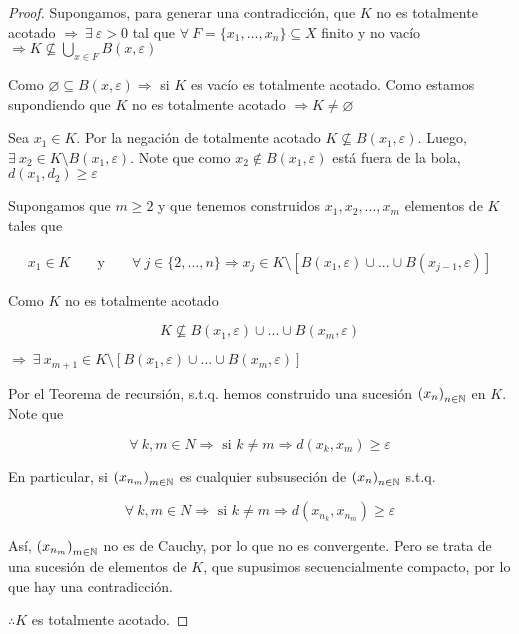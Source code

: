 \begin{proof}
    Supongamos, para generar una contradicción, que $K$ no es totalmente acotado $\Rightarrow \: \exists \: \varepsilon > 0$ tal que $\forall \: F = \{ x_1, ..., x_n \} \subseteq X$ finito y no vacío $\Rightarrow K \nsubseteq \bigcup_{x \in F} B(x, \varepsilon) $

    Como $\varnothing \subseteq B(x, \varepsilon) \Rightarrow$ si $K$ es vacío es totalmente acotado. Como estamos supondiendo que $K$ no es totalmente acotado $\Rightarrow K \neq \varnothing$

    Sea $x_1 \in K$. Por la negación de totalmente acotado $K \nsubseteq B(x_1, \varepsilon)$. Luego, $\exists \: x_2 \in K \setminus B(x_1, \varepsilon)$. Note que como $x_2 \notin B(x_1, \varepsilon)$ está fuera de la bola, $d(x_1, d_2) \geqslant \varepsilon$

    Supongamos que $m \geqslant 2$ y que tenemos construidos $x_1, x_2, ..., x_m$ elementos de $K$ tales que
    
    \begin{align*}
        x_1 \in K && \text{ y } && \forall \: j \in \{ 2, ..., n \} \Rightarrow x_j \in K \setminus \left[ B(x_1, \varepsilon) \cup ... \cup B(x_{j-1}, \varepsilon) \right]
    \end{align*}

    Como $K$ no es totalmente acotado 

    $$K \nsubseteq B(x_1, \varepsilon) \cup ... \cup B(x_m, \varepsilon)$$

    $\Rightarrow \: \exists \: x_{m+1} \in K \setminus \left[ B(x_1, \varepsilon) \cup ... \cup B(x_{m}, \varepsilon) \right]$

    Por el Teorema de recursión, s.t.q. hemos construido una sucesión ${\left(x_n\right)}_{n \in \mathbb{N}}$ en $K$. Note que

    $$\forall \: k, m \in N \Rightarrow \text{ si } k \neq m \Rightarrow d(x_k, x_m) \geqslant \varepsilon$$

    En particular, si ${\left(x_{n_m}\right)}_{m \in \mathbb{N}}$ es cualquier subsuseción de ${\left(x_n\right)}_{n \in \mathbb{N}}$ s.t.q.
    
    $$\forall \: k, m \in N \Rightarrow \text{ si } k \neq m \Rightarrow d(x_{n_k}, x_{n_m}) \geqslant \varepsilon$$

    Así, ${\left(x_{n_m}\right)}_{m \in \mathbb{N}}$ no es de Cauchy, por lo que no es convergente. Pero se trata de una sucesión de elementos de $K$, que supusimos secuencialmente compacto, por lo que hay una contradicción.

    $\therefore K$ es totalmente acotado.
\end{proof}

